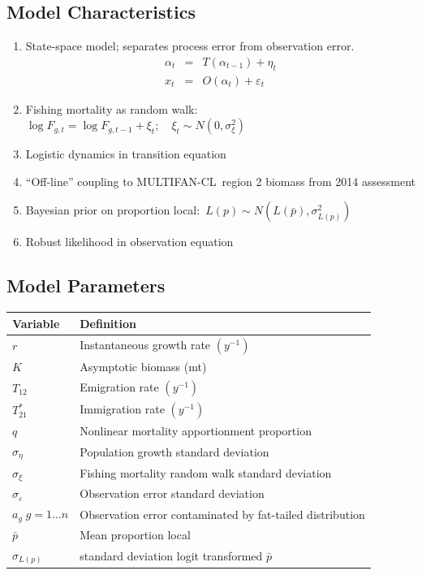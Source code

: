 \documentclass[a4paper,KOMA,landscape,titlepage]{powersem}
\newcommand\MFCL{MULTIFAN-CL}
\begin{document}
\begin{slide}\section{Model Characteristics}
\begin{enumerate}
\item State-space model; separates process error from observation
error.
\begin{eqnarray}
\alpha_t &=&T(\alpha_{t-1}) + \eta_t\\
x_t &=& O(\alpha_t) + \varepsilon_t
\end{eqnarray}
\item Fishing mortality as random walk:~
$\log F_{g,t} = \log F_{g,t-1} + \xi_t;\quad \xi_t\sim
N(0,\sigma^2_\xi)$
\item Logistic dynamics in transition equation
\item ``Off-line'' coupling to \MFCL\ region 2 biomass from 2014 assessment %
\item Bayesian prior on proportion local:~$L(p)\sim
N(L(\bar{p}),\sigma^2_{L(p)})$
\item Robust likelihood in observation equation
\end{enumerate}
\end{slide}

\begin{slide}\section{Model Parameters}
\begin{center}
\begin{tabular}{ll}
\hline
Variable & Definition\\
\hline
\hline
$r$ & Instantaneous growth rate $(y^{-1})$\\
$K$ & Asymptotic biomass (mt) \\
$T_{12}$ & Emigration rate $(y^{-1})$\\
$T^*_{21}$& Immigration rate $(y^{-1})$\\
$q$ & Nonlinear mortality apportionment proportion\\
\hline
$\sigma_\eta$ & Population growth standard deviation\\
$\sigma_\xi$ & Fishing mortality random walk standard deviation\\
$\sigma_\varepsilon$ & Observation error standard deviation \\
$a_g\; g=1\ldots n$ & Observation error contaminated by 
fat-tailed distribution\\
\hline
$\bar{p}$ & Mean proportion local\\
$\sigma_{L(p)}$ & standard deviation logit transformed $\bar{p}$\\
\hline
\end{tabular}
\end{center}
\end{slide}
\end{document}
